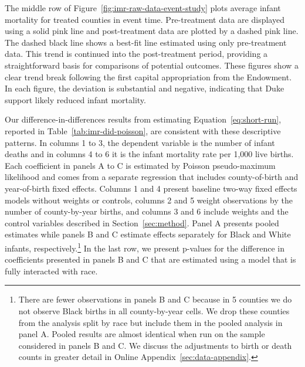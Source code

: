 \documentclass[12pt]{article}
\begin{document}
The middle row of Figure~\ref{fig:imr-raw-data-event-study} plots average infant mortality for treated counties in event time. 
Pre-treatment data are displayed using a solid pink line and post-treatment data are plotted by a dashed pink line. 
The dashed black line shows a best-fit line estimated using only pre-treatment data. 
This trend is continued into the post-treatment period, providing a straightforward basis for comparisons of potential outcomes. 
These figures show a clear trend break following the first capital appropriation from the Endowment. 
In each figure, the deviation is substantial and negative, indicating that Duke support likely reduced infant mortality. 

Our difference-in-differences results from estimating Equation~\ref{eq:short-run}, reported in Table~\ref{tab:imr-did-poisson}, are consistent with these descriptive patterns. 
In columns 1 to 3, the dependent variable is the number of infant deaths and in columns 4 to 6 it is the infant mortality rate per 1,000 live births.
Each coefficient in panels A to C is estimated by Poisson pseudo-maximum likelihood and comes from a separate regression that includes county-of-birth and year-of-birth fixed effects.
Columns 1 and 4 present baseline two-way fixed effects models without weights or controls, columns 2 and 5 weight observations by the number of county-by-year births, and columns 3 and 6 include weights and the control variables described in Section~\ref{sec:method}.
Panel A presents pooled estimates while panels B and C estimate effects separately for Black and White infants, respectively.\footnote{
There are fewer observations in panels B and C because in 5 counties we do not observe Black births in all county-by-year cells.
We drop these counties from the analysis split by race but include them in the pooled analysis in panel A.
Pooled results are almost identical when run on the sample considered in panels B and C. We discuss the adjustments to birth or death counts in greater detail in Online Appendix~\ref{sec:data-appendix}.
}
In the last row, we present p-values for the difference in coefficients presented in panels B and C that are estimated using a model that is fully interacted with race.
\end{document}
